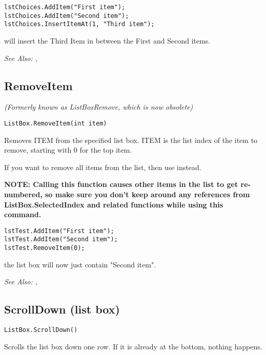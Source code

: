 \begin{verbatim}
lstChoices.AddItem("First item");
lstChoices.AddItem("Second item");
lstChoices.InsertItemAt(1, "Third item");
\end{verbatim}
will insert the Third Item in between the First and Second items.

\it{See Also:} ,


\subsection{RemoveItem}\label{ListBox.RemoveItem}%

\it{(Formerly known as ListBoxRemove, which is now obsolete)}

\begin{verbatim}
ListBox.RemoveItem(int item)
\end{verbatim}
Removes ITEM from the specified list box. ITEM is the list index of the item to
remove, starting with 0 for the top item.

If you want to remove all items from the list, then use 
instead.

\bf{NOTE:} Calling this function causes other items in the list to get re-numbered, so
make sure you don't keep around any references from ListBox.SelectedIndex and related functions
while using this command.

\begin{verbatim}
lstTest.AddItem("First item");
lstTest.AddItem("Second item");
lstTest.RemoveItem(0);
\end{verbatim}
the list box will now just contain "Second item".

\it{See Also:} , 


\subsection{ScrollDown (list box)}\label{ListBox.ScrollDown}%

\begin{verbatim}
ListBox.ScrollDown()
\end{verbatim}
Scrolls the list box down one row. If it is already at the bottom, nothing happens.

